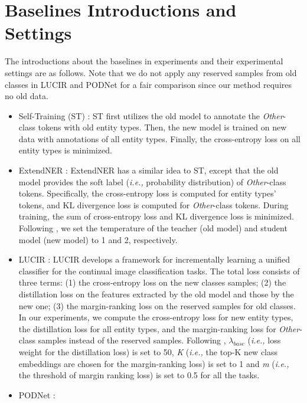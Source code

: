 \documentclass[11pt]{article}
\begin{document}
\section{Baselines Introductions and Settings\label{baselines_settings}}
The introductions about the baselines in experiments and their experimental settings are as follows. 
Note that we do not apply any reserved samples from old classes in LUCIR and PODNet for a fair comparison since our method requires no old data.
\begin{itemize}
    \item Self-Training (ST) \citep{rosenberg2005semi,de2019continual}: 
    ST first utilizes the old model to annotate the \textit{Other}-class tokens with old entity types. 
    Then, the new model is trained on new data with annotations of all entity types. 
Finally, the cross-entropy loss on all entity types is minimized.
    \item ExtendNER \citep{monaikul2021continual}: 
    ExtendNER has a similar idea to ST, except that the old model provides the soft label (\textit{i.e.,} probability distribution) of \textit{Other}-class tokens. 
    Specifically, the cross-entropy loss is computed for entity types' tokens, and KL divergence loss is computed for \textit{Other}-class tokens. 
    During training, the sum of cross-entropy loss and KL divergence loss is minimized.
    Following \citet{monaikul2021continual}, we set the temperature of the teacher (old model) and student model (new model) to 1 and 2, respectively.
    \item LUCIR \citep{hou2019learning}: 
    LUCIR develops a framework for incrementally learning a unified classifier for the continual image classification tasks. 
    The total loss consists of three terms: 
    (1) the cross-entropy loss on the new classes samples; 
    (2) the distillation loss on the features extracted by the old model and those by the new one;
    (3) the margin-ranking loss on the reserved samples for old classes. 
    In our experiments, we compute the cross-entropy loss for new entity types, the distillation loss for all entity types, and the margin-ranking loss for \textit{Other}-class samples instead of the reserved samples. 
    Following \citep{hou2019learning}, $\lambda_{base}$ (\textit{i.e.,} loss weight for the distillation loss) is set to 50, \textit{K} (\textit{i.e.,} the top-K new class embeddings are chosen for the margin-ranking loss) is set to 1 and \textit{m} (\textit{i.e.,} the threshold of margin ranking loss) is set to 0.5 for all the tasks.
    \item PODNet \citep{douillard2020podnet}: 

\end{itemize}
\end{document}
